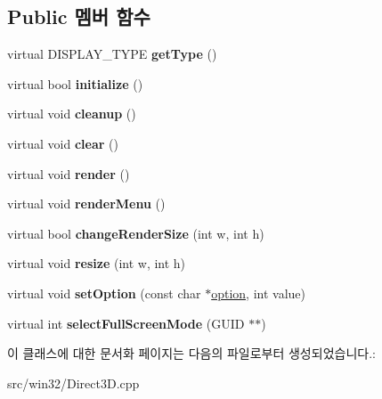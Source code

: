 \subsection*{Public 멤버 함수}
\begin{DoxyCompactItemize}
\item 
\mbox{\label{class_direct3_d_display_a517a805d2a5ebb732671851162920868}} 
virtual D\+I\+S\+P\+L\+A\+Y\+\_\+\+T\+Y\+PE {\bfseries get\+Type} ()
\item 
\mbox{\label{class_direct3_d_display_a8b8dfd84005816382396677e23d38879}} 
virtual bool {\bfseries initialize} ()
\item 
\mbox{\label{class_direct3_d_display_aabdde19c435c484db2e334eca28a8147}} 
virtual void {\bfseries cleanup} ()
\item 
\mbox{\label{class_direct3_d_display_a67b8e31e5bb726cb82efbfb0be90935f}} 
virtual void {\bfseries clear} ()
\item 
\mbox{\label{class_direct3_d_display_a1c789bf663cfd32bb2827b9a0f0429c7}} 
virtual void {\bfseries render} ()
\item 
\mbox{\label{class_direct3_d_display_a099bbef2eaaf90efb3ecb00c68103fe7}} 
virtual void {\bfseries render\+Menu} ()
\item 
\mbox{\label{class_direct3_d_display_a74e1d9129809bda1014bac928cd0fe52}} 
virtual bool {\bfseries change\+Render\+Size} (int w, int h)
\item 
\mbox{\label{class_direct3_d_display_a0e6e22fc78ec40c164ec7943581bcf7f}} 
virtual void {\bfseries resize} (int w, int h)
\item 
\mbox{\label{class_direct3_d_display_a9fb19225514b70c7178aa871c9852936}} 
virtual void {\bfseries set\+Option} (const char $\ast$\mbox{\hyperlink{structoption}{option}}, int value)
\item 
\mbox{\label{class_direct3_d_display_a46be4b83a670d9d29cef2e7131ed46ae}} 
virtual int {\bfseries select\+Full\+Screen\+Mode} (G\+U\+ID $\ast$$\ast$)
\end{DoxyCompactItemize}


이 클래스에 대한 문서화 페이지는 다음의 파일로부터 생성되었습니다.\+:\begin{DoxyCompactItemize}
\item 
src/win32/Direct3\+D.\+cpp\end{DoxyCompactItemize}
